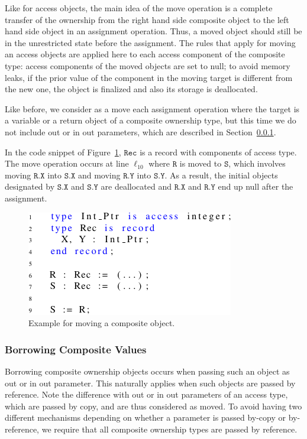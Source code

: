 \documentclass{llncs}
\newcommand\var[1]{\ensuremath{\mathtt{#1}}}
\newcommand{\keyword}[1]{\textsf{#1}}
\begin{document}
Like for access objects, the main idea of the move operation is a complete transfer of the ownership from the right hand side composite object to the left hand
side object in an assignment operation. Thus, a moved object should still be in the unrestricted state before the assignment. The rules that apply for moving an
access objects are applied here to each access component of the composite type: access components of the moved objects are set to null; to avoid memory leaks, if the
prior value of the component in the moving target is different from the new one, the object is finalized and also its storage is deallocated.  

Like before, we consider as a move each assignment operation where the target is a variable or a return object of a composite ownership type, but this time we do not
include \keyword{out} or \keyword{in out} parameters, which are described in Section~\ref{subsubsec:borrowComposite}.

In the code snippet of Figure~\ref{fig:movingComposite}, \var{Rec} is a record with components of access type. The move operation occurs at line $\ell_{10}$ where \var{R} is moved
to \var{S}, which involves moving \var{R.X} into \var{S.X} and moving \var{R.Y} into \var{S.Y}. As a result, the initial objects designated by
\var{S.X} and \var{S.Y} are deallocated and \var{R.X} and \var{R.Y} end up null after the assignment. 


\begin{figure}[htb!]
\centering
   \includegraphics[]{movingComposite}
   \caption{Example for moving a composite object.}
   \label{fig:movingComposite}
\end{figure}
 
\subsubsection{Borrowing Composite Values}
\label{subsubsec:borrowComposite}

Borrowing composite ownership objects occurs when passing such an object as \keyword{out} or \keyword{in out} parameter. This naturally applies when
such objects are passed by reference. Note the difference with \keyword{out} or \keyword{in out} parameters of an access type, which are passed by copy,
and are thus considered as moved. To avoid having two different mechanisms depending on whether a parameter is passed by-copy or by-reference, we require
that all composite ownership types are passed by reference.
\end{document}
